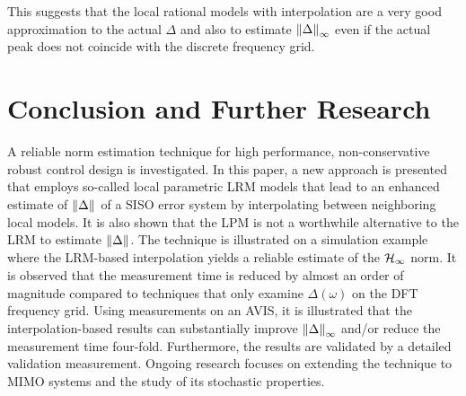 This suggests that the local rational models with interpolation are a very good approximation to the actual $\Delta$ and also to estimate $\left\| \Delta \right\|_{\infty}$ even if the actual peak does not coincide with the discrete frequency grid.

\section{Conclusion and Further Research}
\label{sec:conclusion}
A reliable \Hinf{} norm estimation technique for high performance, non-conservative robust control design is investigated.
In this paper, a new approach is presented that employs so-called local parametric \gls{LRM} models that lead to an enhanced estimate of $\left\| \Delta \right\|_{}$ of a \gls{SISO} error system by interpolating between neighboring local models.
It is also shown that the \gls{LPM} is not a worthwhile alternative to the \gls{LRM} to estimate $\left\| \Delta \right\|_{}$.
The technique is illustrated on a simulation example where the \gls{LRM}-based interpolation yields a reliable estimate of the $\mathcal{H}_{\infty}{}$ norm.
It is observed that the measurement time is reduced by almost an order of magnitude compared to techniques that only examine $\Delta(\omega)$ on the \gls{DFT} frequency grid.
Using measurements on an \gls{AVIS}, it is illustrated that the interpolation-based results can substantially improve $\left\| \Delta \right\|_{\infty}$ and/or reduce the measurement time four-fold.
Furthermore, the results are validated by a detailed validation measurement.
Ongoing research focuses on extending the technique to \gls{MIMO} systems and the study of its stochastic properties.
